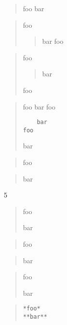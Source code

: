 
\def\mytitle{Blockquotes}


\begin{quote}
foo
bar
\end{quote}

\begin{quote}
foo

\begin{quote}
bar
foo
\end{quote}
\end{quote}

\begin{quote}
foo

\begin{quote}
bar
\end{quote}

foo
\end{quote}

\begin{quote}
foo
bar
 foo

\begin{verbatim}
	bar
foo
\end{verbatim}

bar
\end{quote}

\begin{quote}
foo
\end{quote}

\begin{quote}
bar
\end{quote}

5

\begin{quote}
foo

bar
\end{quote}

\begin{quote}
foo
\end{quote}

\begin{quote}
bar
\end{quote}

\begin{quote}
foo

bar
\end{quote}

\begin{quote}
\begin{verbatim}
*foo*
**bar**
\end{verbatim}
\end{quote}

\begin{quote}
\end{quote}



